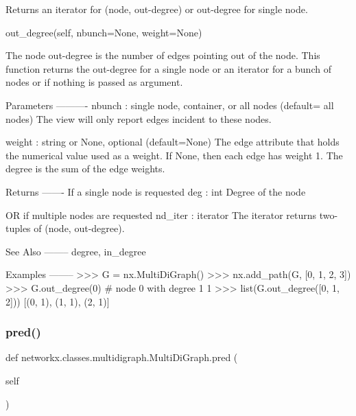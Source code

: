 \begin{DoxyVerb}Returns an iterator for (node, out-degree) or out-degree for single node.

out_degree(self, nbunch=None, weight=None)

The node out-degree is the number of edges pointing out of the node.
This function returns the out-degree for a single node or an iterator
for a bunch of nodes or if nothing is passed as argument.

Parameters
----------
nbunch : single node, container, or all nodes (default= all nodes)
    The view will only report edges incident to these nodes.

weight : string or None, optional (default=None)
   The edge attribute that holds the numerical value used
   as a weight.  If None, then each edge has weight 1.
   The degree is the sum of the edge weights.

Returns
-------
If a single node is requested
deg : int
    Degree of the node

OR if multiple nodes are requested
nd_iter : iterator
    The iterator returns two-tuples of (node, out-degree).

See Also
--------
degree, in_degree

Examples
--------
>>> G = nx.MultiDiGraph()
>>> nx.add_path(G, [0, 1, 2, 3])
>>> G.out_degree(0)  # node 0 with degree 1
1
>>> list(G.out_degree([0, 1, 2]))
[(0, 1), (1, 1), (2, 1)]\end{DoxyVerb}
 \mbox{\label{classnetworkx_1_1classes_1_1multidigraph_1_1MultiDiGraph_a18232cc53022ce5781915dfa22a9a4c4}} 
\subsubsection{\texorpdfstring{pred()}{pred()}}
{\footnotesize\ttfamily def networkx.\+classes.\+multidigraph.\+Multi\+Di\+Graph.\+pred (\begin{DoxyParamCaption}\item[{}]{self }\end{DoxyParamCaption})}

